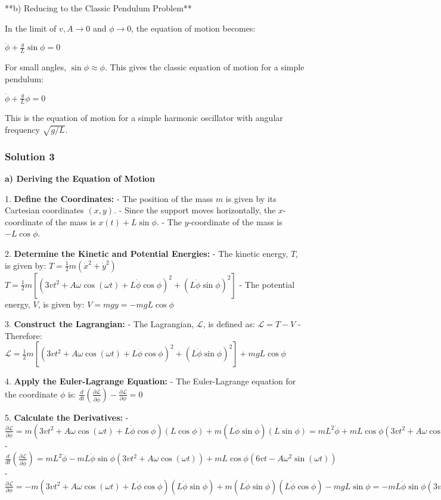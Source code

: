 \documentclass{article}
\begin{document}
**b) Reducing to the Classic Pendulum Problem**

In the limit of $v, A \to 0$ and $\phi \to 0$, the equation of motion becomes:

$\ddot{\phi} + \frac{g}{L}\sin\phi = 0$

For small angles, $\sin\phi \approx \phi$.  This gives the classic equation of motion for a simple pendulum:

$\ddot{\phi} + \frac{g}{L}\phi = 0$

This is the equation of motion for a simple harmonic oscillator with angular frequency $\sqrt{g/L}$.


\subsubsection{Solution 3}
\textbf{a) Deriving the Equation of Motion}

1. \textbf{Define the Coordinates:}
   - The position of the mass $m$ is given by its Cartesian coordinates $(x,y)$.
   - Since the support moves horizontally, the $x$-coordinate of the mass is $x(t) + L \sin \phi$.
   - The $y$-coordinate of the mass is $-L \cos \phi$.

2. \textbf{Determine the Kinetic and Potential Energies:}
   - The kinetic energy, $T$, is given by:
     $T = \frac{1}{2} m (\dot{x}^2 + \dot{y}^2)$
     $T = \frac{1}{2} m [(3vt^2 + A\omega \cos(\omega t) + L\dot{\phi}\cos \phi)^2 + (L\dot{\phi}\sin \phi)^2]$
   - The potential energy, $V$, is given by:
     $V = mgy = -mgL \cos \phi$

3. \textbf{Construct the Lagrangian:}
   - The Lagrangian, $\mathcal{L}$, is defined as: $\mathcal{L} = T - V$
   - Therefore:
     $\mathcal{L} = \frac{1}{2} m [(3vt^2 + A\omega \cos(\omega t) + L\dot{\phi}\cos \phi)^2 + (L\dot{\phi}\sin \phi)^2] + mgL \cos \phi$

4. \textbf{Apply the Euler-Lagrange Equation:}
   - The Euler-Lagrange equation for the coordinate $\phi$ is: $\frac{d}{dt} \left( \frac{\partial \mathcal{L}}{\partial \dot{\phi}} \right) - \frac{\partial \mathcal{L}}{\partial \phi} = 0$

5. \textbf{Calculate the Derivatives:}
   - $\frac{\partial \mathcal{L}}{\partial \dot{\phi}} = m(3vt^2 + A\omega \cos(\omega t) + L\dot{\phi}\cos \phi)(L\cos \phi) + m(L\dot{\phi}\sin \phi)(L\sin \phi) = mL^2 \dot{\phi} + mL \cos \phi (3vt^2 + A\omega \cos(\omega t))$
   - $\frac{d}{dt} \left( \frac{\partial \mathcal{L}}{\partial \dot{\phi}} \right) = mL^2 \ddot{\phi} - mL\dot{\phi}\sin \phi (3vt^2 + A\omega \cos(\omega t)) + mL \cos \phi (6vt - A\omega^2 \sin(\omega t))$
   - $\frac{\partial \mathcal{L}}{\partial \phi} = -m(3vt^2 + A\omega \cos(\omega t) + L\dot{\phi}\cos \phi)(L\dot{\phi}\sin \phi) + m(L\dot{\phi}\sin \phi)(L\dot{\phi}\cos \phi) - mgL \sin \phi = -mL\dot{\phi}\sin \phi (3vt^2 + A\omega \cos(\omega t)) - mgL \sin \phi$
\end{document}
